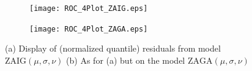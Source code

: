 \documentclass{DissertateUSU}
\begin{document}
\begin{figure}
\centering
\begin{subfigure}[b]{0.5\textwidth}
   \texttt{[image: ROC\_4Plot\_ZAIG.eps]}
   \caption{}
   \label{Residuals_ZAIG} 
\end{subfigure}

\begin{subfigure}[b]{0.5\textwidth}
   \texttt{[image: ROC\_4Plot\_ZAGA.eps]}
   \caption{}
   \label{Residuals_ZAGA}
\end{subfigure}

\caption[Normalized quantile residuals from models ZAIG \& ZAGA]{(a) Display of (normalized quantile) residuals from model $\mbox{ZAIG}(\mu,\sigma,\nu)$ (b) As for (a) but on the model $\mbox{ZAGA}(\mu,\sigma,\nu)$}
\end{figure}


\end{document}
